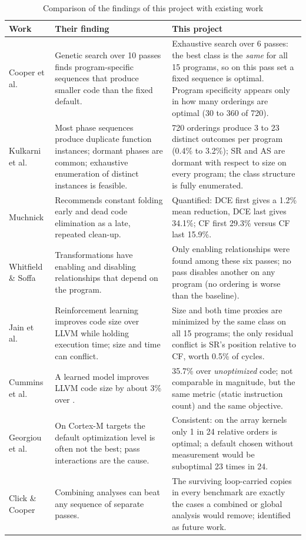 \clearpage
\begin{table}[H]
\centering\footnotesize\renewcommand{\arraystretch}{1.15}
\caption{Comparison of the findings of this project with existing work}
\label{tab:comparison}
\begin{tabular}{L{3.0cm} L{5.0cm} L{5.4cm}}
\toprule
\textbf{Work} & \textbf{Their finding} & \textbf{This project}\\
\midrule
Cooper et al.\ \cite{cooper1999} & Genetic search over 10 passes finds program-specific sequences that produce smaller code than the fixed default. & Exhaustive search over 6 passes: the best class is the \emph{same} for all 15 programs, so on this pass set a fixed sequence is optimal. Program specificity appears only in how many orderings are optimal (30 to 360 of 720).\\
Kulkarni et al.\ \cite{kulkarni2004,kulkarni2006} & Most phase sequences produce duplicate function instances; dormant phases are common; exhaustive enumeration of distinct instances is feasible. & 720 orderings produce 3 to 23 distinct outcomes per program (0.4\% to 3.2\%); SR and AS are dormant with respect to size on every program; the class structure is fully enumerated.\\
Muchnick \cite{muchnick1997} & Recommends constant folding early and dead code elimination as a late, repeated clean-up. & Quantified: DCE first gives a 1.2\% mean reduction, DCE last gives 34.1\%; CF first 29.3\% versus CF last 15.9\%.\\
Whitfield \& Soffa \cite{whitfield1997} & Transformations have enabling and disabling relationships that depend on the program. & Only enabling relationships were found among these six passes; no pass disables another on any program (no ordering is worse than the baseline).\\
Jain et al.\ \cite{jain2022} & Reinforcement learning improves code size over LLVM  while holding execution time; size and time can conflict. & Size and both time proxies are minimized by the same class on all 15 programs; the only residual conflict is SR's position relative to CF, worth 0.5\% of cycles.\\
Cummins et al.\ \cite{cummins2023} & A learned model improves LLVM code size by about 3\% over . & 35.7\% over \emph{unoptimized} code; not comparable in magnitude, but the same metric (static instruction count) and the same objective.\\
Georgiou et al.\ \cite{georgiou2018} & On Cortex-M targets the default optimization level is often not the best; pass interactions are the cause. & Consistent: on the array kernels only 1 in 24 relative orders is optimal; a default chosen without measurement would be suboptimal 23 times in 24.\\
Click \& Cooper \cite{click1995} & Combining analyses can beat any sequence of separate passes. & The surviving loop-carried copies in every benchmark are exactly the cases a combined or global analysis would remove; identified as future work.\\
\bottomrule
\end{tabular}
\end{table}
\clearpage

